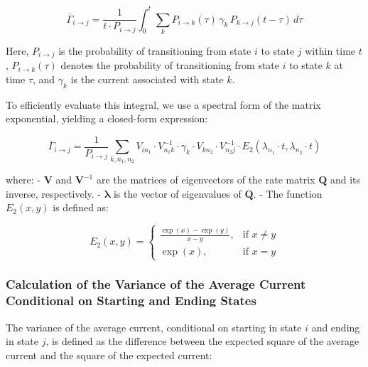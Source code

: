 \documentclass[pdflatex,sn-mathphys-num]{sn-jnl}%
\theoremstyle{thmstyleone}%
\theoremstyle{thmstyletwo}%
\theoremstyle{thmstylethree}%
\begin{document}
\begin{equation}
	\overline{\Gamma}_{i \rightarrow j} = \frac{1}{t \cdot P_{i \rightarrow j}} \int_0^t \sum_k P_{i \rightarrow k}(\tau) \, \gamma_k \, P_{k \rightarrow j}(t - \tau) \, d\tau
	\label{eq:gamma_ij_integral}
\end{equation}

Here, \( P_{i \rightarrow j} \) is the probability of transitioning from state \( i \) to state \( j \) within time \( t \), \( P_{i \rightarrow k}(\tau) \) denotes the probability of transitioning from state \( i \) to state \( k \) at time \( \tau \), and \( \gamma_k \) is the current associated with state \( k \).

To efficiently evaluate this integral, we use a spectral form of the matrix exponential, yielding a closed-form expression:

\begin{equation}
	\overline{\Gamma}_{i \rightarrow j} = \frac{1}{P_{i \rightarrow j}} \sum_{k, n_1, n_2} V_{i n_1} \cdot V^{-1}_{n_1 k} \cdot \gamma_k \cdot V_{k n_2} \cdot V^{-1}_{n_2 j} \cdot E_2(\lambda_{n_1} \cdot t, \lambda_{n_2} \cdot t)
	\label{eq:gamma_ij_formula}
\end{equation}

where:
- \( \mathbf{V} \) and \( \mathbf{V}^{-1} \) are the matrices of eigenvectors of the rate matrix \( \mathbf{Q} \) and its inverse, respectively.
- \( \boldsymbol{\lambda} \) is the vector of eigenvalues of \( \mathbf{Q} \).
- The function \( E_2(x, y) \) is defined as:

\begin{equation}
	E_2(x, y) = 
	\begin{cases}
		\frac{\exp(x) - \exp(y)}{x - y}, & \text{if } x \neq y \\
		\exp(x), & \text{if } x = y
	\end{cases}
    \label{eq:E_2}
\end{equation}


\subsubsection{Calculation of the Variance of the Average Current Conditional on Starting and Ending States}

The variance of the average current, conditional on starting in state \(i\) and ending in state \(j\), is defined as the difference between the expected square of the average current and the square of the expected current:
\end{document}
